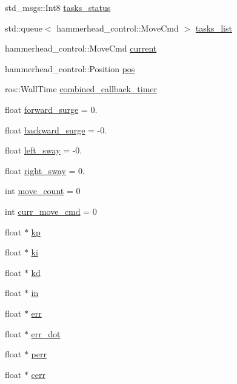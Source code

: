 \begin{DoxyCompactItemize}
std\+\_\+msgs\+::\+Int8 \hyperlink{classControl_a33f504fc4fc4d72aece54ac1d54e0dce}{tasks\+\_\+status}
\item 
std\+::queue$<$ hammerhead\+\_\+control\+::\+Move\+Cmd $>$ \hyperlink{classControl_a8253a25dca4732520650a20d04bc444c}{tasks\+\_\+list}
\item 
hammerhead\+\_\+control\+::\+Move\+Cmd \hyperlink{classControl_af74f0b009e6e0835715c5c84e5e9fdd5}{current}
\item 
hammerhead\+\_\+control\+::\+Position \hyperlink{classControl_a01d178fc453eb32517b91e771ef0c865}{pos}
\item 
ros\+::\+Wall\+Time \hyperlink{classControl_a7a1dd562bded08231a44823a213afbee}{combined\+\_\+callback\+\_\+timer}
\item 
float \hyperlink{classControl_af4f6b06288fafd78cd2cb384a1a16310}{forward\+\_\+surge} = 0.
\item 
float \hyperlink{classControl_a365181f0a2e284023f1bffcb91628f67}{backward\+\_\+surge} = -\/0.
\item 
float \hyperlink{classControl_a13598dbba398020d32610a1318217b29}{left\+\_\+sway} = -\/0.
\item 
float \hyperlink{classControl_a944fd0cb50f0ba016a91fac4d6211a4b}{right\+\_\+sway} = 0.
\item 
int \hyperlink{classControl_a5aa7f5d4f2ef0a5b28658ff4d0c42251}{move\+\_\+count} = 0
\item 
int \hyperlink{classControl_a6b9bafba66e817433e5fe291dd603518}{curr\+\_\+move\+\_\+cmd} = 0
\item 
float $\ast$ \hyperlink{classControl_a3c190679233ca3cceaf3f3e2a00fb377}{kp}
\item 
float $\ast$ \hyperlink{classControl_aedb7684fb944d24bdf1d803f823c156c}{ki}
\item 
float $\ast$ \hyperlink{classControl_a9eaa6a8852f1a6674f39104b313568b3}{kd}
\item 
float $\ast$ \hyperlink{classControl_a76848f8d74014150f7fa48c9c76f9942}{in}
\item 
float $\ast$ \hyperlink{classControl_a79e253da9e02d0b1c9bf35824c966cb5}{err}
\item 
float $\ast$ \hyperlink{classControl_aef9f81ebc43231e739a2e58eb6b22605}{err\+\_\+dot}
\item 
float $\ast$ \hyperlink{classControl_ae1e9586e4f965eece100084c550f2b39}{perr}
\item 
float $\ast$ \hyperlink{classControl_a5b9e1402c27f26e5cc84d1e17a2d83b7}{cerr}
\item 

\end{DoxyCompactItemize}
